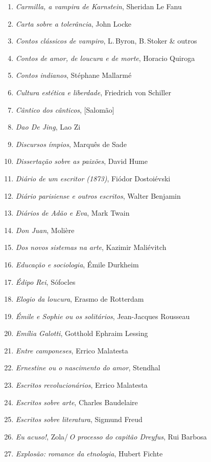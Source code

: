 \begin{enumerate}
\item \textit{Carmilla, a vampira de Karnstein}, Sheridan Le Fanu
\item \textit{Carta sobre a tolerância}, John Locke
\item \textit{Contos clássicos de vampiro}, L.\,Byron, B.\,Stoker \& outros
\item \textit{Contos de amor, de loucura e de morte}, Horacio Quiroga
\item \textit{Contos indianos}, Stéphane Mallarmé
\item \textit{Cultura estética e liberdade}, Friedrich von Schiller
\item \textit{Cântico dos cânticos}, [Salomão]
\item \textit{Dao De Jing}, Lao Zi
\item \textit{Discursos ímpios}, Marquês de Sade
\item \textit{Dissertação sobre as paixões}, David Hume
\item \textit{Diário de um escritor (1873)}, Fiódor Dostoiévski
\item \textit{Diário parisiense e outros escritos}, Walter Benjamin
\item \textit{Diários de Adão e Eva}, Mark Twain
\item \textit{Don Juan}, Molière
\item \textit{Dos novos sistemas na arte}, Kazimir Maliévitch
\item \textit{Educação e sociologia}, Émile Durkheim
\item \textit{Édipo Rei}, Sófocles
\item \textit{Elogio da loucura}, Erasmo de Rotterdam
\item \textit{Émile e Sophie ou os solitários}, Jean-Jacques Rousseau 
\item \textit{Emília Galotti}, Gotthold Ephraim Lessing
\item \textit{Entre camponeses}, Errico Malatesta
\item \textit{Ernestine ou o nascimento do amor}, Stendhal
\item \textit{Escritos revolucionários}, Errico Malatesta
\item \textit{Escritos sobre arte}, Charles Baudelaire
\item \textit{Escritos sobre literatura}, Sigmund Freud
\item \textit{Eu acuso!}, Zola/\,\textit{O processo do capitão Dreyfus}, Rui Barbosa
\item \textit{Explosão: romance da etnologia}, Hubert Fichte

\end{enumerate}
